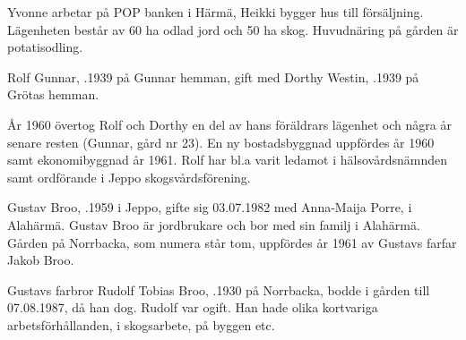 Yvonne arbetar på POP banken i Härmä, Heikki bygger hus till försäljning. Lägenheten består av 60 ha odlad jord och 50 ha skog. Huvudnäring på gården är potatisodling.


%
Rolf Gunnar, .1939 på Gunnar hemman, gift med Dorthy Westin, .1939 på Grötas hemman.
\begin{jhchildren}
  \item {}
  \item {}
\end{jhchildren}

År 1960 övertog Rolf och Dorthy en del av hans föräldrars lägenhet och några år senare resten (Gunnar, gård nr 23). En ny bostadsbyggnad uppfördes år 1960 samt ekonomibyggnad år 1961. Rolf har bl.a varit ledamot i hälsovårdsnämnden samt ordförande i Jeppo skogsvårdsförening.



%



%
Gustav Broo,  .1959 i Jeppo, gifte sig 03.07.1982 med Anna-Maija Porre,  i Alahärmä. Gustav Broo är jordbrukare och bor med sin familj i Alahärmä. Gården på Norrbacka, som numera står tom, uppfördes år 1961 av Gustavs farfar Jakob Broo.
\begin{jhchildren}
  \item {}
  \item {}
  \item {}
  \item {}
\end{jhchildren}


%
Gustavs farbror Rudolf Tobias Broo, .1930 på Norrbacka, bodde i gården till 07.08.1987, då han dog. Rudolf var ogift. Han hade olika kortvariga arbetsförhållanden, i skogsarbete, på byggen etc.


